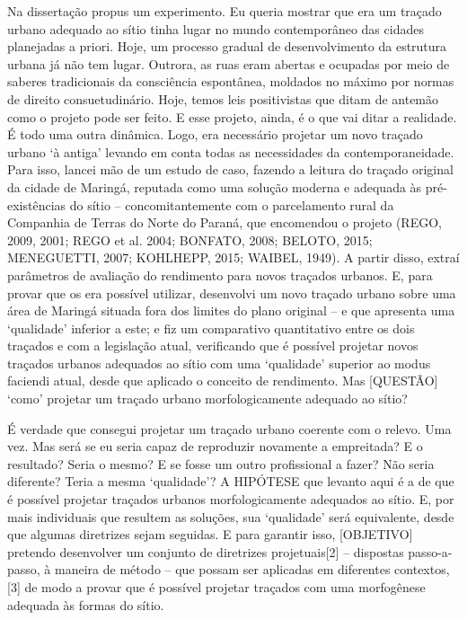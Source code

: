 \documentclass[]{report}
\begin{document}
	Na dissertação propus um experimento. Eu queria mostrar que era um traçado urbano adequado ao sítio tinha lugar no mundo contemporâneo das cidades planejadas a priori. Hoje, um processo gradual de desenvolvimento da estrutura urbana já não tem lugar. Outrora, as ruas eram abertas e ocupadas por meio de saberes tradicionais da consciência espontânea, moldados no máximo por normas de direito consuetudinário. Hoje, temos leis positivistas que ditam de antemão como o projeto pode ser feito. E esse projeto, ainda, é o que vai ditar a realidade. É todo uma outra dinâmica. Logo, era necessário projetar um novo traçado urbano ‘à antiga’ levando em conta todas as necessidades da contemporaneidade. Para isso, lancei mão de um estudo de caso, fazendo a leitura do traçado original da cidade de Maringá, reputada como uma solução moderna e adequada às pré-existências do sítio – concomitantemente com o parcelamento rural da Companhia de Terras do Norte do Paraná, que encomendou o projeto (REGO, 2009, 2001; REGO et al. 2004; BONFATO, 2008; BELOTO, 2015; MENEGUETTI, 2007; KOHLHEPP, 2015; WAIBEL, 1949). A partir disso, extraí parâmetros de avaliação do rendimento para novos traçados urbanos. E, para provar que os era possível utilizar, desenvolvi um novo traçado urbano sobre uma área de Maringá situada fora dos limites do plano original – e que apresenta uma ‘qualidade’ inferior a este; e fiz um comparativo quantitativo entre os dois traçados e com a legislação atual, verificando que é possível projetar novos traçados urbanos adequados ao sítio com uma ‘qualidade’ superior ao modus faciendi atual, desde que aplicado o conceito de rendimento. Mas [QUESTÃO] ‘como’ projetar um traçado urbano morfologicamente adequado ao sítio?

	É verdade que consegui projetar um traçado urbano coerente com o relevo. Uma vez. Mas será se eu seria capaz de reproduzir novamente a empreitada? E o resultado? Seria o mesmo? E se fosse um outro profissional a fazer? Não seria diferente? Teria a mesma ‘qualidade’? A HIPÓTESE que levanto aqui é a de que é possível projetar traçados urbanos morfologicamente adequados ao sítio. E, por mais individuais que resultem as soluções, sua ‘qualidade’ será equivalente, desde que algumas diretrizes sejam seguidas. E para garantir isso, [OBJETIVO] pretendo desenvolver um conjunto de diretrizes projetuais[2] – dispostas passo-a-passo, à maneira de método – que possam ser aplicadas em diferentes contextos,[3] de modo a provar que é possível projetar traçados com uma morfogênese adequada às formas do sítio.
\end{document}
